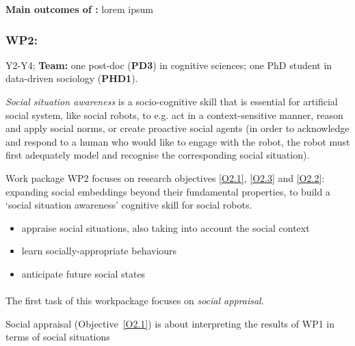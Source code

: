 \begin{framed}
    {\noindent\bf Main outcomes of \tAD:} lorem ipsum 
\end{framed}


\subsubsection{WP2: \textbf{\WPB}}

\begin{framed}
 Y2-Y4; {\bf Team:} one post-doc ({\bf PD3}) in
cognitive sciences; one PhD student in data-driven sociology ({\bf PHD1}).
\end{framed}


\emph{Social situation awareness} is a socio-cognitive skill that is essential for
artificial social system, like social robots, to e.g.  act in a
context-sensitive manner, reason and apply social norms, or create proactive
social agents (in order to acknowledge and respond to a human who would like
to engage with the robot, the robot must first adequately model and
recognise the corresponding social situation).

Work package WP2 focuses on research objectives \ref{O2.1}, \ref{O2.3} and \ref{O2.2}:
expanding social embeddings beyond their fundamental properties, to build a
`social situation awareness' cognitive skill for social robots.

\begin{itemize}
    \item appraise social situations, also taking into account the social context
    \item learn socially-appropriate behaviours
    \item anticipate future social states
\end{itemize}



\paragraph{\TBA}

The first task of this workpackage focuses on \emph{social appraisal}.

Social appraisal (Objective~\ref{O2.1}) is about interpreting the results of WP1
in terms of social situations

